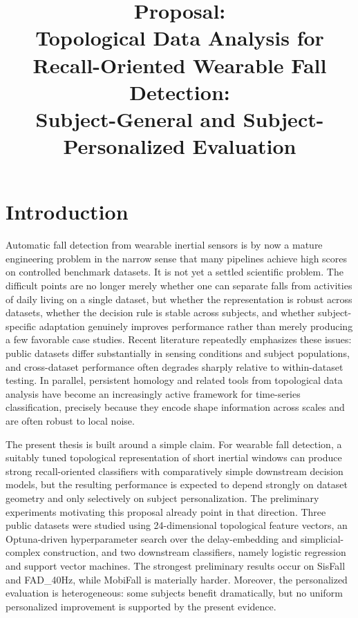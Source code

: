 \documentclass[11pt]{article}
\title{Proposal:\\
Topological Data Analysis for Recall-Oriented Wearable Fall Detection:\\
Subject-General and Subject-Personalized Evaluation}
\author{}
\date{}
\newcommand{\1}{\mathbf 1}
\begin{document}
\maketitle

\section{Introduction}

Automatic fall detection from wearable inertial sensors is by now a mature engineering problem in the narrow sense that many pipelines achieve high scores on controlled benchmark datasets. It is not yet a settled scientific problem. The difficult points are no longer merely whether one can separate falls from activities of daily living on a single dataset, but whether the representation is robust across datasets, whether the decision rule is stable across subjects, and whether subject-specific adaptation genuinely improves performance rather than merely producing a few favorable case studies. Recent literature repeatedly emphasizes these issues: public datasets differ substantially in sensing conditions and subject populations, and cross-dataset performance often degrades sharply relative to within-dataset testing. In parallel, persistent homology and related tools from topological data analysis have become an increasingly active framework for time-series classification, precisely because they encode shape information across scales and are often robust to local noise.

The present thesis is built around a simple claim. For wearable fall detection, a suitably tuned topological representation of short inertial windows can produce strong recall-oriented classifiers with comparatively simple downstream decision models, but the resulting performance is expected to depend strongly on dataset geometry and only selectively on subject personalization. The preliminary experiments motivating this proposal already point in that direction. Three public datasets were studied using 24-dimensional topological feature vectors, an Optuna-driven hyperparameter search over the delay-embedding and simplicial-complex construction, and two downstream classifiers, namely logistic regression and support vector machines. The strongest preliminary results occur on SisFall and FAD\_40Hz, while MobiFall is materially harder. Moreover, the personalized evaluation is heterogeneous: some subjects benefit dramatically, but no uniform personalized improvement is supported by the present evidence.
\end{document}
